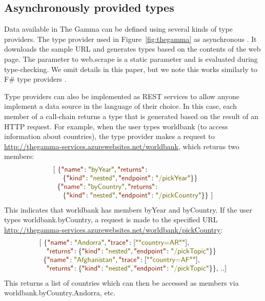 \documentclass[acmsmall,anonymous,fleqn]{acmart}\settopmatter{printfolios=false,printccs=false,printacmref=false}
\theoremstyle{plain}
\theoremstyle{definition}
\newcommand{\str}[1]{\textnormal{\textcolor{strclr}{\sffamily "#1"}}}
\newcommand{\rstr}[1]{\textnormal{\textcolor{rstrclr}{\sffamily "#1"}}}
\newcommand{\ident}[1]{\textnormal{\textcolor{idclr}{\sffamily #1}}}
\begin{document}

\subsection{Asynchronously provided types}
\label{sec:types-providers}

Data available in The Gamma can be defined using several kinds of type providers. The type provider
used in Figure~\ref{fig:thegamma} as asynchronous \cite{async}. It downloads the sample URL and generates
types based on the contents of the web page. The parameter to \ident{web.scrape} is a static
parameter and is evaluated during type-checking. We omit details in this paper, but we note this
works similarly to F\# type providers \cite{providers-fsharp}.

Type providers can also be implemented as REST services \cite{rest} to allow anyone implement a data source
in the language of their choice. In this case, each member of a call-chain returns a type that is
generated based on the result of an HTTP request. For example, when the user types \ident{worldbank}
(to access information about countries), the type provider makes a request to
\url{http://thegamma-services.azurewebsites.net/worldbank}, which returns two members:
%
\begin{equation*}
\begin{array}{l}
[~\{\rstr{name}\!:\str{byYear},\rstr{returns}\!:\\
~\quad \{\rstr{kind}\!:\str{nested},\rstr{endpoint}\!:\str{/pickYear}\}\}\\
\hspace{0.55em}\{\rstr{name}\!:\str{byCountry},\rstr{returns}\!:\\
~\quad \{\rstr{kind}\!:\str{nested},\rstr{endpoint}\!:\str{/pickCountry}\}\}~]
\end{array}
\end{equation*}
%
This indicates that \ident{worldbank} has members \ident{byYear} and \ident{byCountry}.
If the user types \ident{worldbank.byCountry}, a request is made to the specified URL
\url{http://thegamma-services.azurewebsites.net/worldbank/pickCountry}:
%
\begin{equation*}
\begin{array}{l}
[~\{\rstr{name}\!:\str{Andorra},\rstr{trace}\!:[\str{"country=AR"}], \\
\quad \rstr{returns}\!:\{\rstr{kind}\!:\str{nested},\rstr{endpoint}\!:\str{/pickTopic}\}\}\\
\hspace{0.55em}\{\rstr{name}\!:\str{Afghanistan},\rstr{trace}\!:[\str{"country=AF"}],\\
\quad \rstr{returns}\!:\{\rstr{kind}\!:\str{nested},\rstr{endpoint}\!:\str{/pickTopic}\}\},\,..]
\end{array}
\end{equation*}
%
This returns a list of countries which can then be accessed as members via
\ident{worldbank.byCountry.Andorra}, etc.
\end{document}
